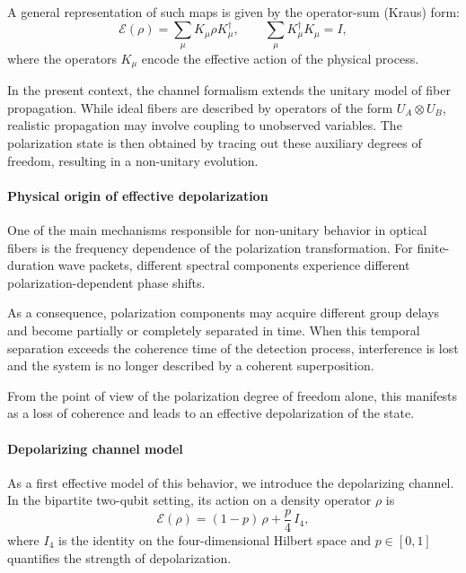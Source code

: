 \documentclass[a4paper]{article}
\begin{document}
A general representation of such maps is given by the operator-sum (Kraus) form:
\[
\mathcal{E}(\rho)
=
\sum_{\mu} K_{\mu} \rho K_{\mu}^\dagger,
\qquad
\sum_{\mu} K_{\mu}^\dagger K_{\mu} = I,
\]
where the operators \( K_{\mu} \) encode the effective action of the physical process.

\medskip

In the present context, the channel formalism extends the unitary model of fiber propagation. While ideal fibers are described by operators of the form \( U_A \otimes U_B \), realistic propagation may involve coupling to unobserved variables. The polarization state is then obtained by tracing out these auxiliary degrees of freedom, resulting in a non-unitary evolution.

\medskip

\paragraph{Physical origin of effective depolarization}

One of the main mechanisms responsible for non-unitary behavior in optical fibers is the frequency dependence of the polarization transformation. For finite-duration wave packets, different spectral components experience different polarization-dependent phase shifts.

As a consequence, polarization components may acquire different group delays and become partially or completely separated in time. When this temporal separation exceeds the coherence time of the detection process, interference is lost and the system is no longer described by a coherent superposition.

\medskip

From the point of view of the polarization degree of freedom alone, this manifests as a loss of coherence and leads to an effective depolarization of the state.

\medskip

\paragraph{Depolarizing channel model}

As a first effective model of this behavior, we introduce the depolarizing channel. In the bipartite two-qubit setting, its action on a density operator \( \rho \) is
\[
\mathcal{E}(\rho)
=
(1 - p)\,\rho
+
\frac{p}{4}\, I_4,
\]
where \( I_4 \) is the identity on the four-dimensional Hilbert space and \( p \in [0,1] \) quantifies the strength of depolarization.
\end{document}
